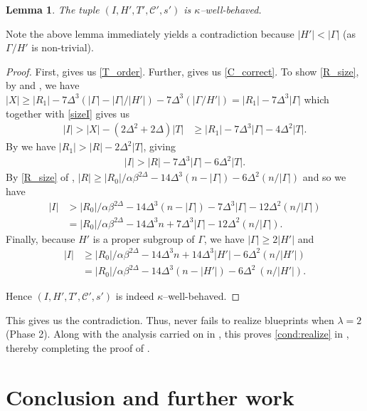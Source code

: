 \documentclass{article}
\newcommand{\cC}{\mathcal{C} }
\newtheorem{lemma}[theorem]{Lemma}
\theoremstyle{definition}
\begin{document}
\begin{lemma}
The tuple $(I,H',T',\cC',s')$ is $\kappa$--well-behaved.
\end{lemma}

Note the above lemma immediately yields a contradiction because $|H'|<|\Gamma|$ (as $\Gamma/H'$ is non-trivial). 

\begin{proof}
First,  gives us \cref{T_order}. Further,  gives us \cref{C_correct}. To show \cref{R_size}, by  and , we have $|X|\geq |R_1| - 7\Delta^3(|\Gamma|-|\Gamma|/|H'|) - 7\Delta^3(|\Gamma/H'|)= |R_1| - 7\Delta^3|\Gamma|$ which together with \cref{sizeI} gives us
\begin{align*}
    |I|>|X|-(2\Delta^2+2\Delta)|T|&\geq |R_1| - 7\Delta^3|\Gamma|-4\Delta^2|T|.
\end{align*}
By  we have $|R_1|>|R| - 2\Delta^2 |T|$, giving
\begin{align*}
    |I|> |R| - 7\Delta^3|\Gamma| - 6\Delta^2|T|.
\end{align*}
By \cref{R_size} of , $|R|\geq |R_0|/\alpha\beta^{2\Delta} - 14\Delta^3(n-|\Gamma|) -6\Delta^2 (n/|\Gamma|)$ and so we have
\begin{align*}
    |I| &> |R_0|/\alpha\beta^{2\Delta} - 14\Delta^3(n-|\Gamma|) - 7\Delta^3|\Gamma| -12\Delta^2 (n/|\Gamma|)
    \\&= |R_0|/\alpha\beta^{2\Delta} - 14\Delta^3 n+ 7\Delta^3|\Gamma|  -12\Delta^2(n/|\Gamma|).
    \end{align*}
Finally, because $H'$ is a proper subgroup of $\Gamma$, we have  $|\Gamma|\geq 2|H'|$ and
\begin{align*}
    |I|&\ge |R_0|/\alpha\beta^{2\Delta} - 14\Delta^3 n+ 14\Delta^3|H'| -6\Delta^2 (n/|H'|)\\
    &=|R_0|/\alpha\beta^{2\Delta} - 14\Delta^3 (n-|H'|) -6\Delta^2\ (n/|H'|)\label{equ:2-6}.
\end{align*}


Hence $(I,H',T',\cC',s')$ is indeed $\kappa$--well-behaved.
\end{proof}

This gives us the contradiction. Thus,  never fails to realize blueprints when $\lambda=2$ (Phase 2). Along with the analysis carried on in , this proves \cref{cond:realize} in , thereby completing the proof of . 

\section{Conclusion and further work}\label{sec.conclusion}
\end{document}
